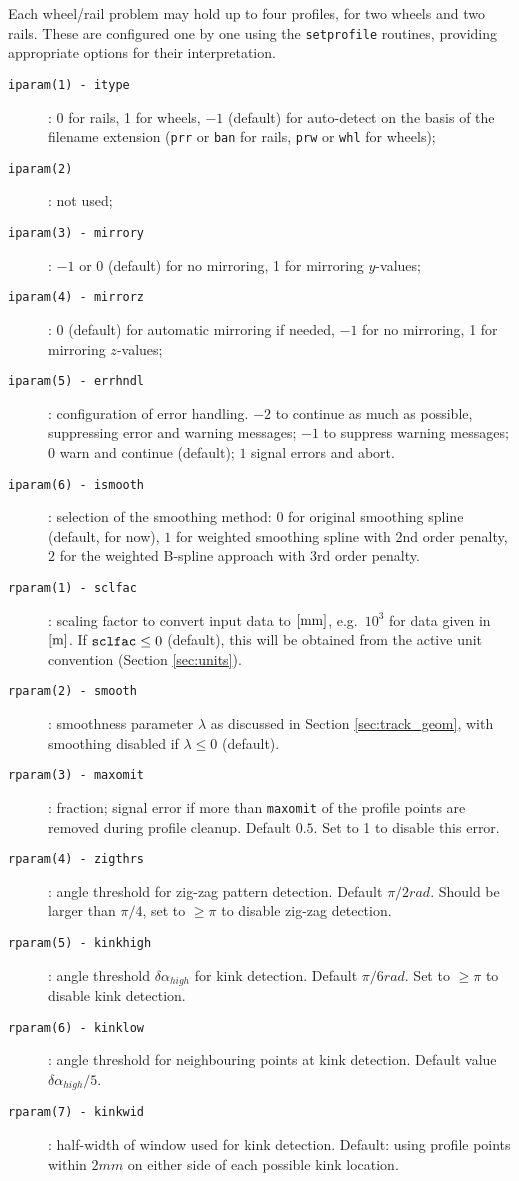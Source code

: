 \documentclass[12pt]{report}
\begin{document}
Each wheel/rail problem may hold up to four profiles, for two wheels and
two rails. These are configured one by one using the {\tt setprofile}
routines, providing appropriate options for their interpretation.
\begin{description}
\item[\tt iparam(1) - itype]: 0 for rails, 1 for wheels, $-1$ (default)
        for auto-detect on the basis of the filename extension ({\tt prr}
        or {\tt ban} for rails, {\tt prw} or {\tt whl} for wheels);
\item[\tt iparam(2)]: not used;
\item[\tt iparam(3) - mirrory]: $-1$ or 0 (default) for no mirroring, 
        1 for mirroring $y$-values;
\item[\tt iparam(4) - mirrorz]: 0 (default) for automatic mirroring if
        needed, $-1$ for no mirroring, 1 for mirroring $z$-values;
\item[\tt iparam(5) - errhndl]: configuration of error handling.
        $-2$ to continue as much as possible, suppressing error and warning
        messages; $-1$ to suppress warning messages; $0$ warn and continue
        (default); $1$ signal errors and abort.
\item[\tt iparam(6) - ismooth]: selection of the smoothing
        method: $0$ for original smoothing spline (default, for now), $1$
        for weighted smoothing spline with 2nd order penalty, $2$ for
        the weighted B-spline approach with 3rd order penalty.
\item[\tt rparam(1) - sclfac]: scaling factor to convert input data
        to $[\mathrm{mm}]$, e.g.\ $10^3$ for data given in $[\mathrm{m}]$. If ${\tt
        sclfac}\le 0$ (default), this will be obtained from the active unit
        convention (Section \ref{sec:units}).
\item[\tt rparam(2) - smooth]: smoothness parameter $\lambda$ as
        discussed in Section \ref{sec:track_geom}, with smoothing disabled
        if $\lambda\le 0$ (default).
\item[\tt rparam(3) - maxomit]: fraction; signal error if more
        than {\tt maxomit} of the profile points are removed during
        profile cleanup. Default $0.5$. Set to 1 to disable this error.
\item[\tt rparam(4) - zigthrs]: angle threshold for zig-zag pattern
        detection. Default $\pi/2\unit{rad}$. Should be larger than
        $\pi/4$, set to $\ge\pi$ to disable zig-zag detection.
\item[\tt rparam(5) - kinkhigh]: angle threshold $\delta\alpha_{high}$ for
        kink detection. Default $\pi/6\unit{rad}$. Set to $\ge\pi$ to disable
        kink detection.
\item[\tt rparam(6) - kinklow]: angle threshold for neighbouring points at
        kink detection. Default value $\delta\alpha_{high}/5$.
\item[\tt rparam(7) - kinkwid]: half-width of window used for kink detection.
        Default: using profile points within $2\unit{mm}$ on either side of
        each possible kink location.
\end{description}
\end{document}
